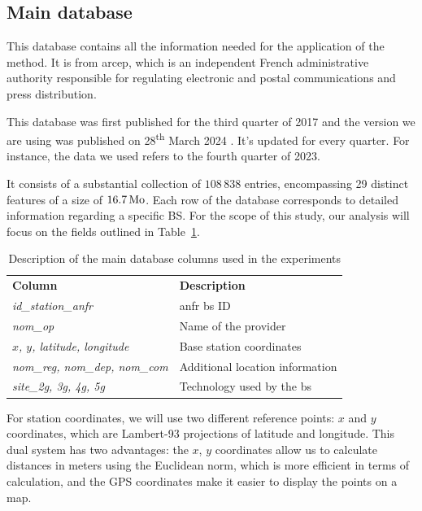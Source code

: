 \documentclass[lettersize,journal,english]{IEEEtran}
\begin{document}
\subsection{Main database}
This database \cite{main_database} contains all the information needed for the application of the method. It is from
\acrfull{arcep}, which is an independent French administrative authority responsible for regulating electronic and postal 
communications and press distribution.

This database was first published for the third quarter of 2017 and the version we are using was published on 28\textsuperscript{th} March 2024 \cite{main_database_hist}.
It's updated for every quarter. For instance, the data we used refers to the fourth quarter of 2023.

It consists of a substantial collection of $108\,838$ entries, encompassing 29 distinct features of a size of $\unit[16.7]{Mo}$.
Each row of the database corresponds to detailed information regarding a specific BS. For the scope of this study,
our analysis will focus on the fields outlined in Table~\ref{table:data_columns}.
\begin{table}
    \centering
    \caption{Description of the main database columns used in the experiments}
    \label{table:data_columns}
    \begin{tabular}{ll}
        \toprule
        \textbf{Column} & \textbf{Description} \\
        \cmidrule(lr){1-2}
        \textsl{id\_station\_anfr} & \acrshort{anfr} \acrshort{bs} ID \\ 
        \textsl{nom\_op} & Name of the provider \\
        \textsl{$x$, $y$, latitude, longitude} & Base station coordinates \\ 
        \textsl{nom\_reg, nom\_dep, nom\_com} & Additional location information \\  
        \textsl{site\_2g, 3g, 4g, 5g} & Technology used by the \acrshort{bs} \\ 
        \bottomrule
    \end{tabular}
\end{table}

For station coordinates, we will use two different reference points: $x$ and $y$ coordinates, which are Lambert-93 projections of latitude and longitude.
This dual system has two advantages: the $x$, $y$ coordinates allow us to calculate distances in meters using the Euclidean norm,
which is more efficient in terms of calculation, and the GPS coordinates make it easier to display the points on a map.
\end{document}
